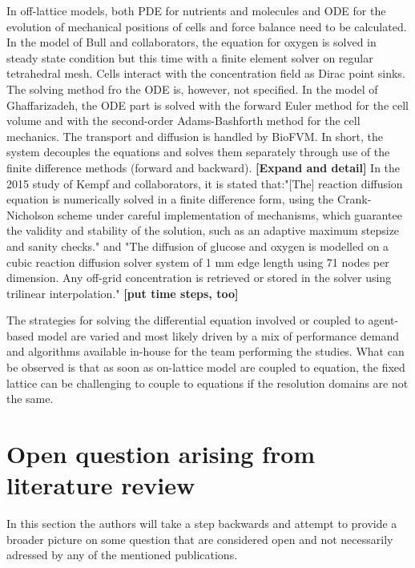 \documentclass[11pt,a4paper]{article}
\begin{document}
In off-lattice models, both PDE for nutrients and molecules and ODE for the evolution of mechanical positions of cells and force balance need to be calculated. In the model of Bull and collaborators, the equation for oxygen is solved in steady state condition but this time with a finite element solver on regular tetrahedral mesh.\cite{Bull2020} Cells interact with the concentration field  as Dirac point sinks. The solving method fro the ODE is, however, not specified. In the model of Ghaffarizadeh, the ODE part is solved with the forward Euler method for the cell volume and with the second-order Adams-Bashforth method for the cell mechanics.\cite{Ghaffarizadeh2017} The transport and diffusion is handled by BioFVM. In short, the system decouples the equations and solves them separately through use of the finite difference methods (forward and backward). \textbf{[Expand and detail]}
In the 2015 study of Kempf and collaborators, it is stated that:"[The] reaction diffusion equation is numerically solved in a finite difference form, using the Crank-Nicholson scheme under careful implementation of mechanisms, which guarantee the validity and stability of the solution, such as an adaptive maximum stepsize and sanity checks." and "The diffusion of glucose and oxygen is modelled on a cubic reaction diffusion solver system of 1 mm edge length using 71 nodes per dimension. Any off-grid concentration is retrieved or stored in the solver using trilinear interpolation." \cite{Kempf2015}
\textbf{[put time steps, too]}

The strategies for solving the differential equation involved or coupled to agent-based model are varied and most likely driven by a mix of performance demand and algorithms available in-house for the team performing the studies. What can be observed is that as soon as on-lattice model are coupled to equation, the fixed lattice can be challenging to couple to equations if the resolution domains are not the same.


\section{Open question arising from literature review}
In this section the authors will take a step backwards and attempt to provide a broader picture on some question that are considered open and not necessarily adressed by any of the mentioned publications. 
\end{document}
